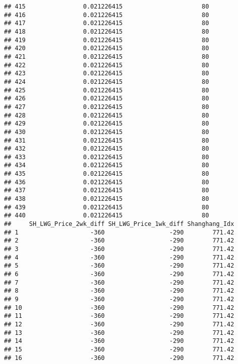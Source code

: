 \documentclass[]{article}
\begin{document}
\begin{verbatim}
## 415                0.021226415                      80
## 416                0.021226415                      80
## 417                0.021226415                      80
## 418                0.021226415                      80
## 419                0.021226415                      80
## 420                0.021226415                      80
## 421                0.021226415                      80
## 422                0.021226415                      80
## 423                0.021226415                      80
## 424                0.021226415                      80
## 425                0.021226415                      80
## 426                0.021226415                      80
## 427                0.021226415                      80
## 428                0.021226415                      80
## 429                0.021226415                      80
## 430                0.021226415                      80
## 431                0.021226415                      80
## 432                0.021226415                      80
## 433                0.021226415                      80
## 434                0.021226415                      80
## 435                0.021226415                      80
## 436                0.021226415                      80
## 437                0.021226415                      80
## 438                0.021226415                      80
## 439                0.021226415                      80
## 440                0.021226415                      80
##     SH_LWG_Price_2wk_diff SH_LWG_Price_1wk_diff Shanghang_Idx
## 1                    -360                  -290        771.42
## 2                    -360                  -290        771.42
## 3                    -360                  -290        771.42
## 4                    -360                  -290        771.42
## 5                    -360                  -290        771.42
## 6                    -360                  -290        771.42
## 7                    -360                  -290        771.42
## 8                    -360                  -290        771.42
## 9                    -360                  -290        771.42
## 10                   -360                  -290        771.42
## 11                   -360                  -290        771.42
## 12                   -360                  -290        771.42
## 13                   -360                  -290        771.42
## 14                   -360                  -290        771.42
## 15                   -360                  -290        771.42
## 16                   -360                  -290        771.42

\end{verbatim}
\end{document}
